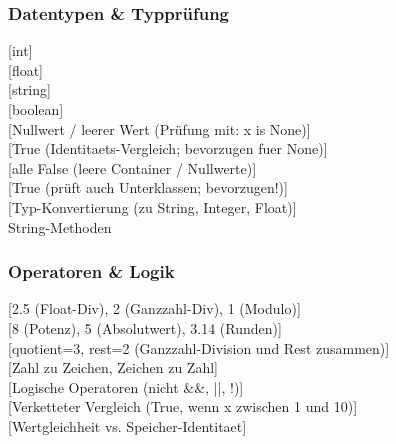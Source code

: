 \subsubsection{Datentypen \& Typprüfung}\label{sec:01-datentypen}
\begin{contentbox}
[int]\\
[float]\\
[string]\\
[boolean]\\
[Nullwert / leerer Wert (Prüfung mit: x is None)]\\
[True (Identitaets-Vergleich; bevorzugen fuer None)]\\
[alle False (leere Container / Nullwerte)]\\
[True (prüft auch Unterklassen; bevorzugen!)]\\
[Typ-Konvertierung (zu String, Integer, Float)]\\
String-Methoden 
\end{contentbox}

\subsubsection{Operatoren \& Logik}\label{sec:01-operatoren}
\begin{contentbox}
[2.5 (Float-Div), 2 (Ganzzahl-Div), 1 (Modulo)]\\
[8 (Potenz), 5 (Absolutwert), 3.14 (Runden)]\\
[quotient=3, rest=2 (Ganzzahl-Division und Rest zusammen)]\\
[Zahl zu Zeichen, Zeichen zu Zahl]\\
[Logische Operatoren (nicht \&\&, ||, !)]\\
[Verketteter Vergleich (True, wenn x zwischen 1 und 10)]\\
[Wertgleichheit vs. Speicher-Identitaet]
\end{contentbox}

